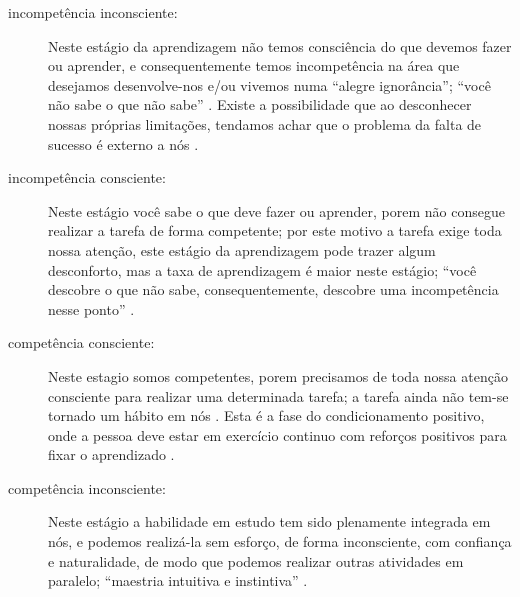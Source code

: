 \begin{description}
\item[incompetência inconsciente:] Neste estágio da aprendizagem não temos consciência do que devemos fazer ou aprender,
e consequentemente temos incompetência na área que desejamos desenvolve-nos e/ou vivemos numa ``alegre ignorância'';
``você não sabe o que não sabe'' \cite[pp. 29, 252]{seymourtreinando} \cite{carnegie2014lideranca} \cite{de2013treinamentos}.
Existe a possibilidade que ao desconhecer nossas próprias limitações,
tendamos achar que o problema da falta de sucesso é externo a nós \cite[pp. 10]{passadori7}.
\item[incompetência consciente:] Neste estágio você sabe o que deve fazer ou aprender,
\label{ref:IncompetenciaConsciente}
porem não consegue realizar a tarefa de forma competente;
por este motivo a tarefa exige toda nossa atenção, 
este estágio da aprendizagem pode trazer algum desconforto,
mas a taxa de aprendizagem é maior neste estágio;
``você descobre o que não sabe, consequentemente, descobre uma incompetência nesse ponto''
\cite[pp. 29]{seymourtreinando} \cite{carnegie2014lideranca} \cite[pp. 10, 11]{passadori7} \cite{de2013treinamentos}.
\item[competência consciente:] 
\label{ref:CompetenciaConsciente}
Neste estagio somos competentes, 
porem precisamos de toda nossa atenção consciente 
para realizar uma determinada tarefa; a tarefa ainda não tem-se tornado um hábito em nós 
\cite[pp. 30, 249]{seymourtreinando} \cite{carnegie2014lideranca} \cite{de2013treinamentos}.
Esta é a fase do condicionamento positivo,
onde a pessoa deve estar em exercício continuo com reforços positivos para fixar o aprendizado \cite[pp. 11]{passadori7}.
\item[competência inconsciente:] 
\label{ref:CompetenciaInconsciente}
Neste estágio a habilidade em estudo tem sido plenamente integrada em nós, 
e podemos realizá-la sem esforço, de forma inconsciente, com confiança e naturalidade, 
de modo que podemos realizar outras atividades em paralelo;
``maestria intuitiva e instintiva'' \cite[pp. 30, 249]{seymourtreinando} \cite[pp. 11]{passadori7} \cite{de2013treinamentos}.
\end{description}


